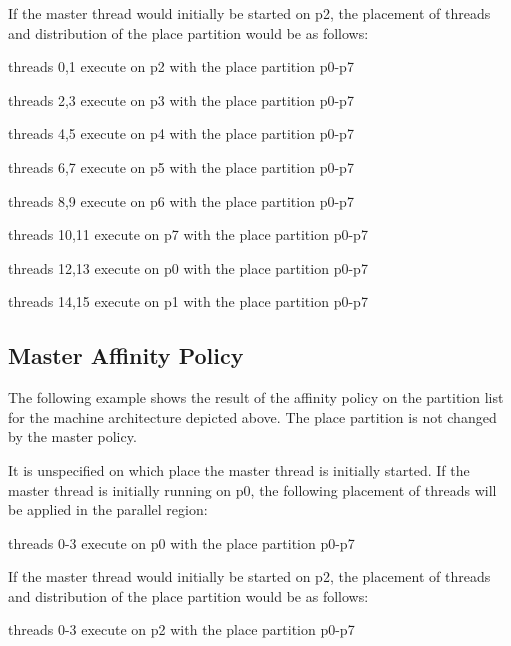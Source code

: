 If the master thread would initially be started on p2, the placement of threads 
and distribution of the place partition would be as follows:

\begin{compactitem}
\item threads 0,1 execute on p2 with the place partition p0-p7

\item threads 2,3 execute on p3 with the place partition p0-p7

\item threads 4,5 execute on p4 with the place partition p0-p7

\item threads 6,7 execute on p5 with the place partition p0-p7

\item threads 8,9 execute on p6 with the place partition p0-p7

\item threads 10,11 execute on p7 with the place partition p0-p7

\item threads 12,13 execute on p0 with the place partition p0-p7

\item threads 14,15 execute on p1 with the place partition p0-p7
\end{compactitem}

\subsection{Master Affinity Policy}
\label{subsec:affinity_master}

The following example shows the result of the  affinity policy on 
the partition list for the machine architecture depicted above. The place partition 
is not changed by the master policy.



It is unspecified on which place the master thread is initially started. If the 
master thread is initially running on p0, the following placement of threads will 
be applied in the parallel region:

\begin{compactitem}
\item threads 0-3 execute on p0 with the place partition p0-p7
\end{compactitem}

If the master thread would initially be started on p2, the placement of threads 
and distribution of the place partition would be as follows:

\begin{compactitem}
\item threads 0-3 execute on p2 with the place partition p0-p7
\end{compactitem}


